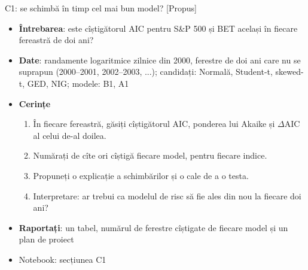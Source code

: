 \begin{frame}{C1: se schimbă în timp cel mai bun model? [Propus]}
\itemsize{\footnotesize}
\begin{itemize}
\item \textbf{Întrebarea}: este cîștigătorul AIC pentru S\&P 500 și BET același în fiecare fereastră de doi ani?
\item \textbf{Date}: randamente logaritmice zilnice din 2000, ferestre de doi ani care nu se suprapun (2000--2001, 2002--2003, ...); candidați: Normală, Student-t, skewed-t, GED, NIG; modele: B1, A1
\item \textbf{Cerințe}
\begin{enumerate}
    \item În fiecare fereastră, găsiți cîștigătorul AIC, ponderea lui Akaike și $\Delta$AIC al celui de-al doilea.
    \item Numărați de cîte ori cîștigă fiecare model, pentru fiecare indice.
    \item Propuneți o explicație a schimbărilor și o cale de a o testa.
    \item Interpretare: ar trebui ca modelul de risc să fie ales din nou la fiecare doi ani?
\end{enumerate}
\item \textbf{Raportați}: un tabel, numărul de ferestre cîștigate de fiecare model și un plan de proiect
\item Notebook: secțiunea C1
\end{itemize}
\end{frame}

